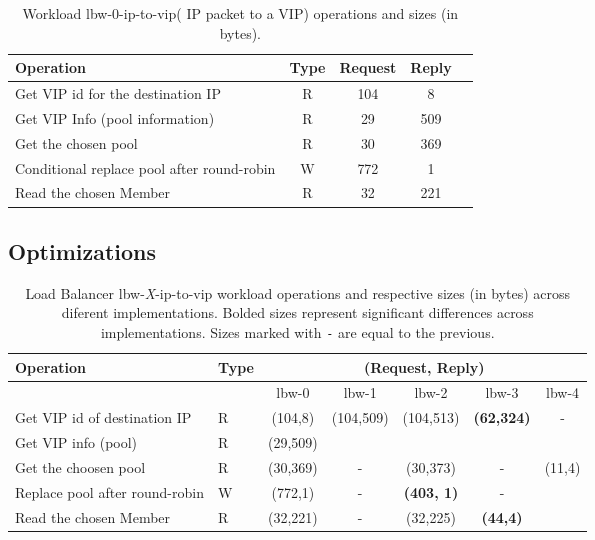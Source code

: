 \documentclass[12pt,openright,twoside]{report}
\begin{document}
\begin{table}[ht]
\small
\centering 
\begin{tabular}{l c c c c}
 Operation & Type & Request & Reply \\ \toprule 
Get VIP id for the destination IP & R & 104 & 8\\
Get VIP Info (pool information) & R & 29 & 509\\
Get the chosen pool & R & 30 & 369\\
Conditional replace pool after round-robin & W & 772 & 1\\
Read the chosen Member & R & 32 & 221 \\ \bottomrule
\end{tabular}\caption[Workload lbw-0-ip-to-vip( IP packet to a VIP)
operations]{Workload lbw-0-ip-to-vip( IP packet to a VIP) operations
  and sizes (in bytes).}
\label{table:lbw-0-ip-to-vip}
\end{table}




\subsection{Optimizations}
\begin{table}[ht]
\small
\begin{tabular}{llccccc}
 Operation & Type &  \multicolumn{5}{c}{ (Request, Reply) } \\  \midrule
&  & lbw-0 & lbw-1  & lbw-2 & lbw-3 & lbw-4 \\ \toprule 
Get VIP id of destination IP  & R & (104,8) &\multirow{2}{*}{(104,509)} &  \multirow{2}{*}{(104,513)} &\multirow{2}{*}{\textbf{(62,324)}} & \multirow{2}{*}{-}    \\\cmidrule{1-2} 
Get VIP info (pool)   & R &  (29,509) & & & &   \\ \midrule 
Get the choosen pool  & R & (30,369)  &  - & (30,373) & -   & \multirow{3}{*}[-2mm]{(11,4)}  \\  \cmidrule{1-2} 
Replace pool after round-robin  & W & (772,1) & -
&\textbf{(403, 1)} &  - \\ \cmidrule{1-2}  
  Read the chosen Member &  R & (32,221) & - & (32,225) & \textbf{(44,4)} & \\\bottomrule  
\end{tabular}\caption[Load Balancer IP to VIP workload operations across
diferent implementations.]{Load Balancer  lbw-\textit{X}-ip-to-vip workload
  operations and respective sizes (in bytes) across diferent
  implementations. Bolded sizes represent significant differences
  across implementations. Sizes marked with \texttt{-} are equal to
  the previous. }\label{table:lbw:optimizations}
\end{table}
\end{document}
